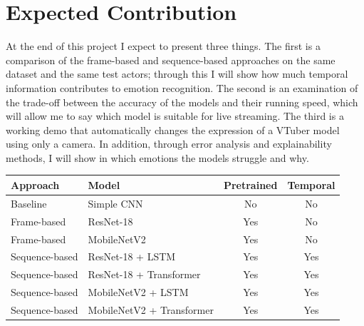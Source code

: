 \documentclass[10pt,a4paper,twocolumn]{article}
\begin{document}
\section{Expected Contribution}
At the end of this project I expect to present three things. The first is a comparison of the frame-based and sequence-based approaches on the same dataset and the same test actors; through this I will show how much temporal information contributes to emotion recognition. The second is an examination of the trade-off between the accuracy of the models and their running speed, which will allow me to say which model is suitable for live streaming. The third is a working demo that automatically changes the expression of a VTuber model using only a camera. In addition, through error analysis and explainability methods, I will show in which emotions the models struggle and why.

\newpage %
\begin{center}
\label{tab:models}
\small\setlength{\tabcolsep}{2.5pt}
\begin{tabular}{@{}llcc@{}}
\toprule
Approach & Model & Pretrained & Temporal \\
\midrule
Baseline       & Simple CNN              & No  & No  \\
Frame-based    & ResNet-18               & Yes & No  \\
Frame-based    & MobileNetV2             & Yes & No  \\
Sequence-based & ResNet-18 + LSTM        & Yes & Yes \\
Sequence-based & ResNet-18 + Transformer & Yes & Yes \\
Sequence-based & MobileNetV2 + LSTM        & Yes & Yes \\
Sequence-based & MobileNetV2 + Transformer & Yes & Yes \\
\bottomrule
\end{tabular}
\end{center}
\vspace{1ex}
\end{document}

